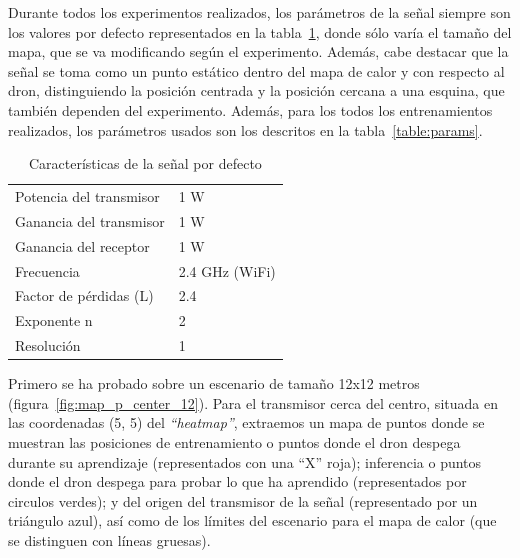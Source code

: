 Durante todos los experimentos realizados, los parámetros de la señal siempre son los valores por defecto representados en la tabla~\ref{table:compare_graph}, donde sólo varía el tamaño del mapa, que se va modificando según el experimento. Además, cabe destacar que la señal se toma como un punto estático dentro del mapa de calor y con respecto al dron, distinguiendo la posición centrada y la posición cercana a una esquina, que también dependen del experimento. Además, para los todos los entrenamientos realizados, los parámetros usados son los descritos en la tabla~\ref{table:params}.\\

\begin{table} [t]
    \centering
    \begin{tabular}{ll}
    Potencia del transmisor & 1 W            \\
    Ganancia del transmisor & 1 W            \\
    Ganancia del receptor   & 1 W            \\
    Frecuencia              & 2.4 GHz (WiFi) \\
    Factor de pérdidas (L)  & 2.4            \\
    Exponente n             & 2              \\
    Resolución              & 1              \\
    \end{tabular}
    \caption[Características de la señal por defecto]{Características de la señal por defecto}
    \label{table:compare_graph}
\end{table}

Primero se ha probado sobre un escenario de tamaño 12x12 metros (figura~\ref{fig:map_p_center_12}). Para el transmisor cerca del centro, situada en las coordenadas (5, 5) del \emph{``heatmap''}, extraemos un mapa de puntos donde se muestran las posiciones de entrenamiento o puntos donde el dron despega durante su aprendizaje (representados con una ``X'' roja); inferencia o puntos donde el dron despega para probar lo que ha aprendido (representados por circulos verdes); y del origen del transmisor de la señal (representado por un triángulo azul), así como de los límites del escenario para el mapa de calor (que se distinguen con líneas gruesas).\\

